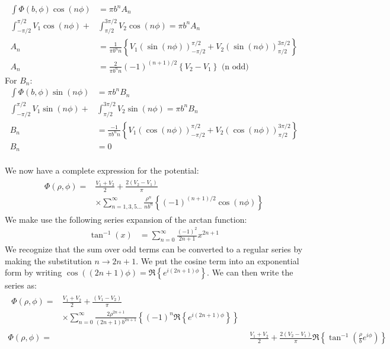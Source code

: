 \documentclass[a4paper,11pt]{article}
\numberwithin{equation}{section}
\newcommand{\lrp}[1]{\left({#1}\right)}
\newcommand{\lrb}[1]{\left\{{#1}\right\}}
\begin{document}
\begin{align}
 \int \Phi(b,\phi)\cos{(n\phi)} &= \pi b^n A_n\\
 \int_{-\pi/2}^{\pi/2}V_1\cos{(n\phi)} +&\int_{\pi/2}^{3\pi/2}V_2\cos{(n\phi)}= \pi b^n A_n\\
 A_n &= \frac{1}{\pi b^n n}\lrb{V_1\lrp{\sin{(n\phi)}}_{-\pi/2}^{\pi/2}+V_2\lrp{\sin{(n\phi)}}_{\pi/2}^{3\pi/2}}\\
 A_n &= \frac{2}{\pi b^n n}(-1)^{(n+1)/2}\lrb{V_2-V_1}\text{ (n odd)}
\end{align}
For $B_n$:
\begin{align}
 \int \Phi(b,\phi)\sin{(n\phi)} &= \pi b^n B_n\\
 \int_{-\pi/2}^{\pi/2}V_1\sin{(n\phi)}+&\int_{\pi/2}^{3\pi/2}V_2\sin{(n\phi)} = \pi b^n B_n\\
 B_n &= \frac{-1}{\pi b^n n}\lrb{V_1\lrp{\cos{(n\phi)}}_{-\pi/2}^{\pi/2}+V_2\lrp{\cos{(n\phi)}}_{\pi/2}^{3\pi/2}}\\
 B_n &= 0
\end{align}
\\
We now have a complete expression for the potential:
\begin{align}
 \begin{split}
  \Phi(\rho,\phi) = &\frac{V_1+V_2}{2}+\frac{2(V_2-V_1)}{\pi}\\
                    &\times\sum_{n=1,3,5...}^\infty\frac{\rho^n}{nb^n}\lrb{(-1)^{(n+1)/2}\cos{(n\phi)}}
 \end{split}
\end{align}
We make use the following series expansion of the arctan function:
\begin{align}
 \tan^{-1}(x) &= \sum_{n=0}^\infty \frac{(-1)^2}{2n+1}x^{2n+1}
\end{align}
We recognize that the sum over odd terms can be converted to a regular series by making the substitution $n\rightarrow 2n+1$.
We put the cosine term into an exponential form by writing $\cos{((2n+1)\phi)}= \Re\lrb{e^{i(2n+1)\phi}}$.
We can then write the series as:
\begin{align}
 \begin{split}
  \Phi(\rho,\phi) = &\frac{V_1+V_2}{2}+\frac{(V_1-V_2)}{\pi}\\
                    &\times\sum_{n=0}^\infty\frac{2\rho^{2n+1}}{(2n+1)b^{2n+1}}\lrb{(-1)^n\Re\lrb{e^{i(2n+1)\phi}}}
 \end{split}\\
 \Phi(\rho,\phi) = &\frac{V_1+V_2}{2}+\frac{2(V_2-V_1)}{\pi}\Re\lrb{\tan^{-1}\lrp{\frac{\rho}{b}e^{i\phi}}}
\end{align}
\end{document}
